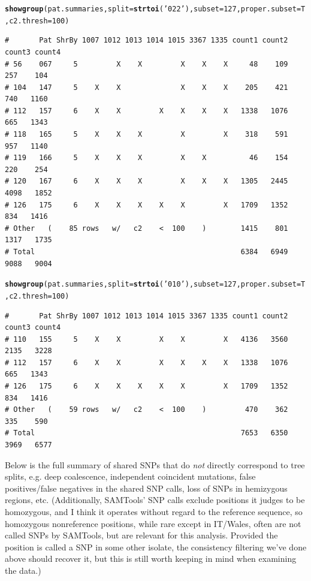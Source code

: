 \documentclass{article}\usepackage[]{graphicx}\usepackage[]{color}
\makeatletter
\newcommand{\hlnum}[1]{\textcolor[rgb]{0.686,0.059,0.569}{#1}}%
\newcommand{\hlstr}[1]{\textcolor[rgb]{0.192,0.494,0.8}{#1}}%
\newcommand{\hlstd}[1]{\textcolor[rgb]{0.345,0.345,0.345}{#1}}%
\newcommand{\hlkwc}[1]{\textcolor[rgb]{0.333,0.667,0.333}{#1}}%
\newcommand{\hlkwd}[1]{\textcolor[rgb]{0.737,0.353,0.396}{\textbf{#1}}}%
\newenvironment{kframe}{%
 \def\at@end@of@kframe{}%
 \ifinner\ifhmode%
  \def\at@end@of@kframe{\end{minipage}}%
  \begin{minipage}{\columnwidth}%
 \fi\fi%
 \def\FrameCommand##1{\hskip\@totalleftmargin \hskip-\fboxsep
 \colorbox{shadecolor}{##1}\hskip-\fboxsep
     \hskip-\linewidth \hskip-\@totalleftmargin \hskip\columnwidth}%
 \MakeFramed {\advance\hsize-\width
   \@totalleftmargin\z@ \linewidth\hsize
   \@setminipage}}%
 {\par\unskip\endMakeFramed%
 \at@end@of@kframe}
\newenvironment{knitrout}{}{} %
\makeatother
\begin{document}
\begin{knitrout}\footnotesize
{}\color{fgcolor}\begin{kframe}
\begin{alltt}
\hlkwd{showgroup}\hlstd{(pat.summaries,}\hlkwc{split}\hlstd{=}\hlkwd{strtoi}\hlstd{(}\hlstr{'022'}\hlstd{),} \hlkwc{subset}\hlstd{=}\hlnum{127}\hlstd{,} \hlkwc{proper.subset}\hlstd{=T,} \hlkwc{c2.thresh}\hlstd{=}\hlnum{100}\hlstd{)}
\end{alltt}
\begin{verbatim}
#       Pat ShrBy 1007 1012 1013 1014 1015 3367 1335 count1 count2 count3 count4
# 56    067     5         X    X         X    X    X     48    109    257    104
# 104   147     5    X    X              X    X    X    205    421    740   1160
# 112   157     6    X    X         X    X    X    X   1338   1076    665   1343
# 118   165     5    X    X    X         X         X    318    591    957   1140
# 119   166     5    X    X    X         X    X          46    154    220    254
# 120   167     6    X    X    X         X    X    X   1305   2445   4098   1852
# 126   175     6    X    X    X    X    X         X   1709   1352    834   1416
# Other   (    85 rows   w/   c2    <  100    )        1415    801   1317   1735
# Total                                                6384   6949   9088   9004
\end{verbatim}
\begin{alltt}
\hlkwd{showgroup}\hlstd{(pat.summaries,}\hlkwc{split}\hlstd{=}\hlkwd{strtoi}\hlstd{(}\hlstr{'010'}\hlstd{),} \hlkwc{subset}\hlstd{=}\hlnum{127}\hlstd{,} \hlkwc{proper.subset}\hlstd{=T,} \hlkwc{c2.thresh}\hlstd{=}\hlnum{100}\hlstd{)}
\end{alltt}
\begin{verbatim}
#       Pat ShrBy 1007 1012 1013 1014 1015 3367 1335 count1 count2 count3 count4
# 110   155     5    X    X         X    X         X   4136   3560   2135   3228
# 112   157     6    X    X         X    X    X    X   1338   1076    665   1343
# 126   175     6    X    X    X    X    X         X   1709   1352    834   1416
# Other   (    59 rows   w/   c2    <  100    )         470    362    335    590
# Total                                                7653   6350   3969   6577
\end{verbatim}
\end{kframe}
\end{knitrout}

Below is the full summary of shared SNPs that do \emph{not} directly correspond to tree splits, e.g. deep coalescence, independent coincident mutations, false positives/false negatives in the shared SNP calls, loss of SNPs in hemizygous regions, etc.  (Additionally, SAMTools' SNP calls exclude positions it judges to be homozygous, and I think it operates without regard to the reference sequence, so homozygous nonreference positions, while rare except in IT/Wales, often are not called SNPs by SAMTools, but are relevant for this analysis.  Provided the position is called a SNP in some other isolate, the consistency filtering we've done above should recover it, but this is still worth keeping in mind when examining the data.) 
\end{document}
